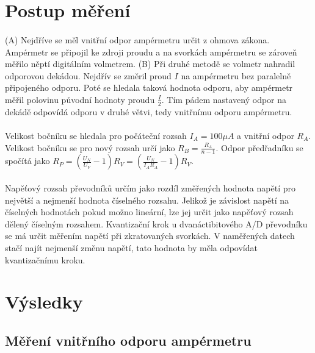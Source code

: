 \documentclass[a4paper,11pt]{article}
\begin{document}
\section{Postup měření}

    \paragraph{} (A) Nejdříve se měl vnitřní odpor ampérmetru určit z ohmova zákona. 
    Ampérmetr se připojil ke zdroji proudu a na svorkách ampérmetru se zároveň měřilo
    něptí digitálním volmetrem. (B) Při druhé metodě se volmetr nahradil odporovou dekádou.
    Nejdřív se změril proud $I$ na ampérmetru bez paralelně připojeného odporu. Poté 
    se hledala taková hodnota odporu, aby ampérmetr měřil polovinu původní hodnoty
    proudu $\frac{I}{2}$. Tím pádem nastavený odpor na dekádě odpovídá odporu v druhé
    větvi, tedy vnitřnímu odporu ampérmetru.

    \paragraph{} Velikost bočníku se hledala pro počáteční rozsah $I_{A} = 100 \mu A$
    a vnitřní odpor $R_{A}$.  Velikost bočníku se pro nový rozsah určí jako 
    $R_{B} = \frac{R_{A}}{n - 1}$. Odpor předřadníku se spočítá jako 
    $R_{P} = (\frac{U_{N}}{U_{V}} - 1) R_{V} = (\frac{U_{N}}{I_{A} R_{A}} - 1) R_{V}$. 

    \paragraph{} Napěťový rozsah převodníků určím jako rozdíl změřených hodnota napětí
    pro největší a nejmenší hodnota číselného rozsahu. Jelikož je závislost napětí na
    číselných hodnotách pokud možno lineární, lze jej určit jako napěťový rozsah 
    dělený číselným rozsahem. Kvantizační krok u dvanáctibitového A/D převodníku
    se má určit měřením napětí při zkratovaných svorkách. V naměřených datech stačí najít
    nejmenší změnu napětí, tato hodnota by měla odpovídat kvantizačnímu kroku.

\section{Výsledky}

    \subsection{Měření vnitřního odporu ampérmetru}
\end{document}
